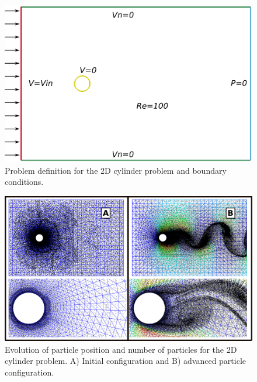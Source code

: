 \begin{figure}[htp] 
\centering 
\includegraphics[scale=.5]{./imgs/cyl_def.png}
\caption{Problem definition for the 2D cylinder problem and boundary conditions.}
\label{fig:cyl_def}
\end{figure}
%
\begin{figure}[htp]
\centering 
\includegraphics[scale=.4]{./imgs/cyl_parts.png}
\caption{Evolution of particle position and number of particles for the 2D cylinder problem. A) Initial configuration and B) advanced particle configuration.}
\label{fig:cyl_evol}
\end{figure}
%
